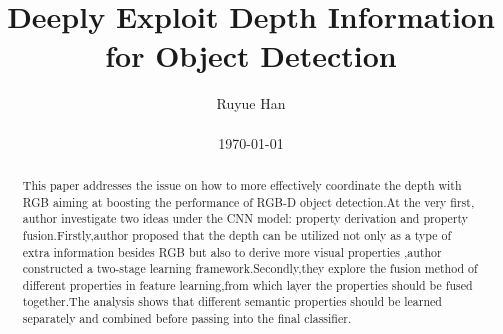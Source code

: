 \documentclass[10pt,twocolumn,letterpaper]{article}
\begin{document}
\title{Deeply Exploit Depth Information for Object Detection}

\author{Ruyue Han\\\\ \today}

\maketitle

\begin{abstract}
This paper addresses the issue on how to more effectively coordinate the depth with RGB aiming at boosting the performance of RGB-D object detection.At the very first, author investigate two ideas under the CNN model: property derivation and property fusion.Firstly,author proposed that the depth can be utilized not only as a type of extra information besides RGB but also to derive more visual properties ,author constructed a two-stage learning framework.Secondly,they explore the fusion method of different properties in feature learning,from which layer the properties should be fused together.The analysis shows that different semantic
properties should be learned separately and combined before passing into the final classifier.
\end{abstract}
\end{document}

